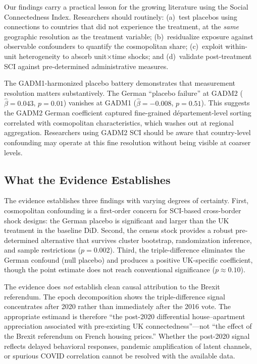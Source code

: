\documentclass[12pt]{article}
\begin{document}
Our findings carry a practical lesson for the growing literature using the Social Connectedness Index. Researchers should routinely: (a)~test placebos using connections to countries that did not experience the treatment, at the \textit{same} geographic resolution as the treatment variable; (b)~residualize exposure against observable confounders to quantify the cosmopolitan share; (c)~exploit within-unit heterogeneity to absorb unit$\times$time shocks; and (d)~validate post-treatment SCI against pre-determined administrative measures.

The GADM1-harmonized placebo battery demonstrates that measurement resolution matters substantively. The German ``placebo failure'' at GADM2 ($\hat{\beta} = 0.043$, $p = 0.01$) vanishes at GADM1 ($\hat{\beta} = -0.008$, $p = 0.51$). This suggests the GADM2 German coefficient captured fine-grained d\'epartement-level sorting correlated with cosmopolitan characteristics, which washes out at regional aggregation. Researchers using GADM2 SCI should be aware that country-level confounding may operate at this fine resolution without being visible at coarser levels.

\subsection{What the Evidence Establishes}

The evidence establishes three findings with varying degrees of certainty. First, cosmopolitan confounding is a first-order concern for SCI-based cross-border shock designs: the German placebo is significant and larger than the UK treatment in the baseline DiD. Second, the census stock provides a robust pre-determined alternative that survives cluster bootstrap, randomization inference, and sample restrictions ($p = 0.002$). Third, the triple-difference eliminates the German confound (null placebo) and produces a positive UK-specific coefficient, though the point estimate does not reach conventional significance ($p \approx 0.10$).

The evidence does \textit{not} establish clean causal attribution to the Brexit referendum. The epoch decomposition shows the triple-difference signal concentrates after 2020 rather than immediately after the 2016 vote. The appropriate estimand is therefore ``the post-2020 differential house--apartment appreciation associated with pre-existing UK connectedness''---not ``the effect of the Brexit referendum on French housing prices.'' Whether the post-2020 signal reflects delayed behavioral responses, pandemic amplification of latent channels, or spurious COVID correlation cannot be resolved with the available data.
\end{document}
